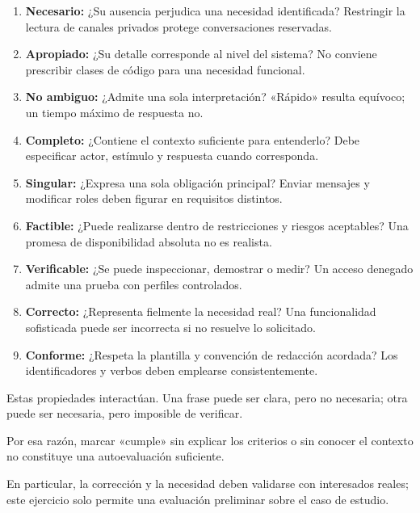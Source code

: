 \documentclass[12pt,a4paper]{article}
\begin{document}
\begin{enumerate}[label=\arabic*.,noitemsep]

\item \textbf{Necesario:}
¿Su ausencia perjudica una necesidad identificada?
Restringir la lectura de canales privados protege conversaciones reservadas.

\item \textbf{Apropiado:}
¿Su detalle corresponde al nivel del sistema?
No conviene prescribir clases de código para una necesidad funcional.

\item \textbf{No ambiguo:}
¿Admite una sola interpretación?
«Rápido» resulta equívoco; un tiempo máximo de respuesta no.

\item \textbf{Completo:}
¿Contiene el contexto suficiente para entenderlo?
Debe especificar actor, estímulo y respuesta cuando corresponda.

\item \textbf{Singular:}
¿Expresa una sola obligación principal?
Enviar mensajes y modificar roles deben figurar en requisitos distintos.

\item \textbf{Factible:}
¿Puede realizarse dentro de restricciones y riesgos aceptables?
Una promesa de disponibilidad absoluta no es realista.

\item \textbf{Verificable:}
¿Se puede inspeccionar, demostrar o medir?
Un acceso denegado admite una prueba con perfiles controlados.

\item \textbf{Correcto:}
¿Representa fielmente la necesidad real?
Una funcionalidad sofisticada puede ser incorrecta si no resuelve lo solicitado.

\item \textbf{Conforme:}
¿Respeta la plantilla y convención de redacción acordada?
Los identificadores y verbos deben emplearse consistentemente.

\end{enumerate}

Estas propiedades interactúan. Una frase puede ser clara, pero no necesaria; otra puede ser necesaria, pero imposible de verificar.

Por esa razón, marcar «cumple» sin explicar los criterios o sin conocer el contexto no constituye una autoevaluación suficiente.

En particular, la corrección y la necesidad deben validarse con interesados reales; este ejercicio solo permite una evaluación preliminar sobre el caso de estudio.
\end{document}
